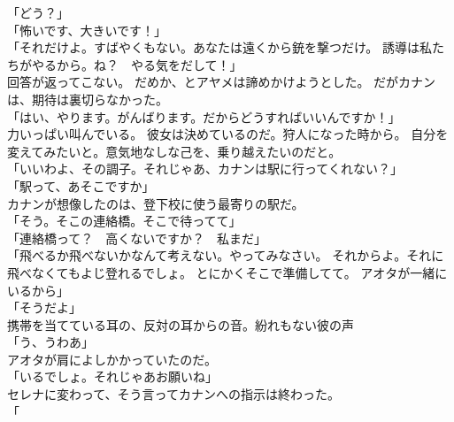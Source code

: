 \documentclass[../IHMain]{subfiles}
\begin{document}
「どう？」\\
「怖いです、大きいです！」\\
「それだけよ。すばやくもない。あなたは遠くから銃を撃つだけ。
誘導は私たちがやるから。ね？　やる気をだして！」\\
回答が返ってこない。
だめか、とアヤメは諦めかけようとした。
だがカナンは、期待は裏切らなかった。\\
「はい、やります。がんばります。だからどうすればいいんですか！」\\
力いっぱい叫んでいる。
彼女は決めているのだ。狩人になった時から。
自分を変えてみたいと。意気地なしな己を、乗り越えたいのだと。\\
「いいわよ、その調子。それじゃあ、カナンは駅に行ってくれない？」\\
「駅って、あそこですか」\\
カナンが想像したのは、登下校に使う最寄りの駅だ。\\
「そう。そこの連絡橋。そこで待ってて」\\
「連絡橋って？　高くないですか？　私まだ」\\
「飛べるか飛べないかなんて考えない。やってみなさい。
それからよ。それに飛べなくてもよじ登れるでしょ。
とにかくそこで準備してて。
アオタが一緒にいるから」\\
「そうだよ」\\
携帯を当てている耳の、反対の耳からの音。紛れもない彼の声\\
「う、うわあ」\\
アオタが肩によしかかっていたのだ。\\
「いるでしょ。それじゃあお願いね」\\
セレナに変わって、そう言ってカナンへの指示は終わった。\\
「
\end{document}
